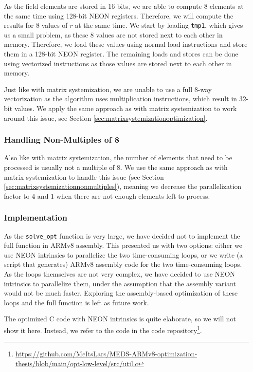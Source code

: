 \documentclass[11pt,a4paper]{report}
\theoremstyle{definition}
\begin{document}
As the field elements are stored in 16 bits, we are able to compute 8 elements at the same time using 128-bit NEON registers. Therefore, we will compute the results for 8 values of $r$ at the same time. We start by loading \texttt{tmp1}, which gives us a small problem, as these 8 values are not stored next to each other in memory. Therefore, we load these values using normal load instructions and store them in a 128-bit NEON register. The remaining loads and stores can be done using vectorized instructions as those values are stored next to each other in memory.

Just like with matrix systemization, we are unable to use a full 8-way vectorization as the algorithm uses multiplication instructions, which result in 32-bit values. We apply the same approach as with matrix systemization to work around this issue, see Section \ref{sec:matrixsystemizationoptimization}.

\subsubsection{Handling Non-Multiples of 8}
Also like with matrix systemization, the number of elements that need to be processed is usually not a multiple of 8. We use the same approach as with matrix systemization to handle this issue (see Section \ref{sec:matrixsystemizationnonmultiples}), meaning we decrease the parallelization factor to 4 and 1 when there are not enough elements left to process.

\subsubsection{Implementation}
As the \texttt{solve\_opt} function is very large, we have decided not to implement the full function in ARMv8 assembly. This presented us with two options: either we use NEON intrinsics to parallelize the two time-consuming loops, or we write (a script that generates) ARMv8 assembly code for the two time-consuming loops. As the loops themselves are not very complex, we have decided to use NEON intrinsics to parallelize them, under the assumption that the assembly variant would not be much faster. Exploring the assembly-based optimization of these loops and the full function is left as future work.

The optimized C code with NEON intrinsics is quite elaborate, so we will not show it here. Instead, we refer to the code in the code repository\footnote{\url{https://github.com/MeItsLars/MEDS-ARMv8-optimization-thesis/blob/main/opt-low-level/src/util.c}}.
\end{document}

